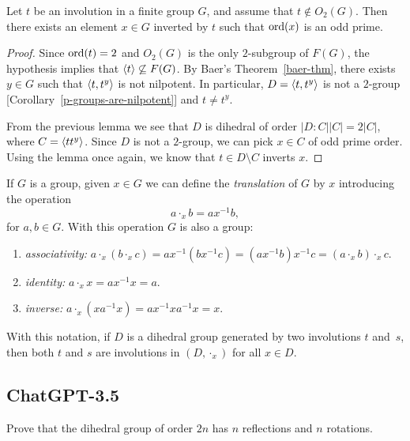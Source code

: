 \begin{thm}\label{dihedral-odd-cycle}
    Let\/ $t$ be an involution in a finite group\/ $G$, and assume that\/ $t\notin O_2(G)$. Then there exists an element\/ $x\in G$ inverted by\/ $t$ such that ${\rm ord}(x)$ is an odd prime.
\end{thm}

\begin{proof} Since ${\rm ord}(t)=2$ and $O_2(G)$ is the only $2$-subgroup of $F(G)$, the hypothesis implies that $\langle t\rangle\not\subseteq F(G)$. By Baer's Theorem~\ref{baer-thm}, there exists $y\in G$ such that $\langle t,t^y\rangle$ is not nilpotent. In particular, $D=\langle t,t^y\rangle$ is not a $2$-group [Corollary~\ref{p-groups-are-nilpotent}] and $t\ne t^y$.

From the previous lemma we see that $D$ is dihedral of order $|D:C||C|=2|C|$, where $C=\langle tt^y\rangle$. Since $D$ is not a $2$-group, we can pick $x\in C$ of odd prime order. Using the lemma once again, we know that $t\in D\setminus C$ inverts $x$.  \end{proof}

\begin{rem}\label{rem:translated-group}
    If\/ $G$ is a group, given\/ $x\in G$ we can define the \textsl{translation} of\/ $G$ by\/ $x$ introducing the operation
    $$
        a\cdot_x b= ax^{-1}b,
    $$
    for\/ $a,b\in G$. With this operation\/ $G$ is also a group:
    \begin{enumerate}[-]
        \item \textit{associativity:} $a\cdot_x(b\cdot_x c)=ax^{-1}(bx^{-1}c)=(ax^{-1}b)x^{-1}c=(a\cdot_x b)\cdot_x c$.
        \item \textit{identity:} $a\cdot_x x= ax^{-1}x=a$.
        \item \textit{inverse:} $a\cdot_x(xa^{-1}x) = ax^{-1}xa^{-1}x=x$.
    \end{enumerate}
    With this notation, if\/ $D$ is a dihedral group generated by two involutions $t$ and~$s$, then both\/ $t$ and\/ $s$ are involutions in\/ $(D,\cdot_x)$ for all $x\in D$.
\end{rem}

\subsection{ChatGPT-3.5}

\begin{probl}
    Prove that the dihedral group of order $2n$ has $n$ reflections and $n$ rotations.
\end{probl}


